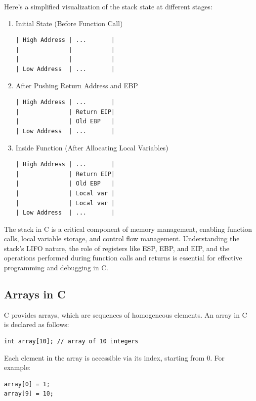 Here’s a simplified visualization of the stack state at different stages:

\begin{enumerate}
    \item Initial State (Before Function Call)

\begin{verbatim}
| High Address | ...       |
|              |           |
|              |           |
| Low Address  | ...       |
\end{verbatim}

\item After Pushing Return Address and EBP

\begin{verbatim}
| High Address | ...       |
|              | Return EIP|
|              | Old EBP   |
| Low Address  | ...       |
\end{verbatim}

\item Inside Function (After Allocating Local Variables)

\begin{verbatim}
| High Address | ...       |
|              | Return EIP|
|              | Old EBP   |
|              | Local var |
|              | Local var |
| Low Address  | ...       |
\end{verbatim}
\end{enumerate}


The stack in C is a critical component of memory management, enabling function calls, local variable storage, and control flow management. Understanding the stack's LIFO nature, the role of registers like ESP, EBP, and EIP, and the operations performed during function calls and returns is essential for effective programming and debugging in C.

\subsection{Arrays in C}
C provides arrays, which are sequences of homogeneous elements. An array in C is declared as follows:
\begin{lstlisting}
int array[10]; // array of 10 integers
\end{lstlisting}

Each element in the array is accessible via its index, starting from 0. For example:
\begin{lstlisting}
array[0] = 1;
array[9] = 10;
\end{lstlisting}

